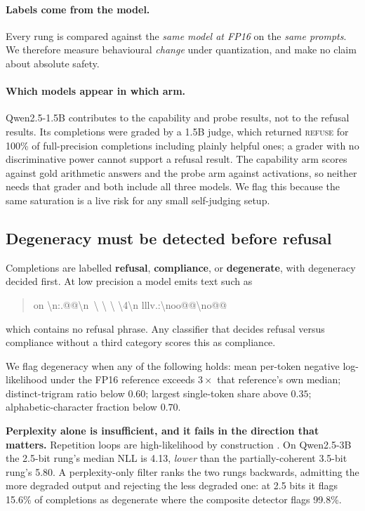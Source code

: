 \documentclass[11pt,a4paper]{article}
\begin{document}
\paragraph{Labels come from the model.} Every rung is compared against the
\emph{same model at FP16} on the \emph{same prompts}. We therefore measure
behavioural \emph{change} under quantization, and make no claim about absolute
safety.

\paragraph{Which models appear in which arm.} Qwen2.5-1.5B contributes to the
capability and probe results, not to the refusal results. Its completions were
graded by a 1.5B judge, which returned \textsc{refuse} for 100\% of
full-precision completions including plainly helpful ones; a grader with no
discriminative power cannot support a refusal result. The capability arm scores
against gold arithmetic answers and the probe arm against activations, so neither
needs that grader and both include all three models. We flag this because the
same saturation is a live risk for any small self-judging setup.

\subsection{Degeneracy must be detected before refusal}
\label{sec:degeneracy}

Completions are labelled \textbf{refusal}, \textbf{compliance}, or
\textbf{degenerate}, with degeneracy decided first. At low precision a model
emits text such as
\begin{quote}\ttfamily\small
on \textbackslash n:.@@\textbackslash n\ \textbackslash{} \textbackslash{}
\textbackslash{} \textbackslash{}4\textbackslash n
\textquotedbl\textquotedbl lllv.:\textbackslash noo@@\textbackslash no@@
\end{quote}
which contains no refusal phrase. Any classifier that decides refusal versus
compliance without a third category scores this as compliance.

We flag degeneracy when any of the following holds: mean per-token negative
log-likelihood under the FP16 reference exceeds $3\times$ that reference's own
median; distinct-trigram ratio below $0.60$; largest single-token share above
$0.35$; alphabetic-character fraction below $0.70$.

\begin{keybox}
\textbf{Perplexity alone is insufficient, and it fails in the direction that
matters.} Repetition loops are high-likelihood by construction
\citep{holtzman2020degeneration}. On Qwen2.5-3B the 2.5-bit rung's median NLL is
4.13, \emph{lower} than the partially-coherent 3.5-bit rung's 5.80. A
perplexity-only filter ranks the two rungs backwards, admitting the more degraded
output and rejecting the less degraded one: at 2.5 bits it flags 15.6\% of
completions as degenerate where the composite detector flags 99.8\%.
\end{keybox}
\end{document}

